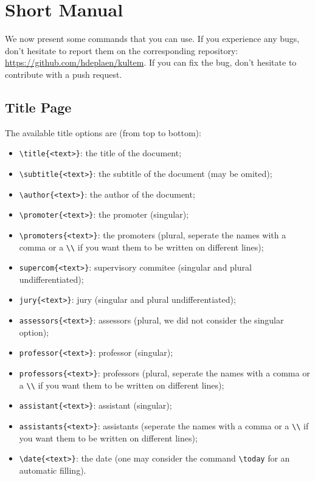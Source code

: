 \documentclass[oneside,a4paper,11pt,explicit]{book}
\begin{document}
\chapter{Short Manual}
\lstset{basicstyle=\ttfamily,breaklines=true}
We now present some commands that you can use. If you experience any bugs, don't hesitate to report them on the corresponding repository: \url{https://github.com/hdeplaen/kultem}. If you can fix the bug, don't hesitate to contribute with a push request.

\section{Title Page}
The available title options are (from top to bottom):
\begin{itemize}
    \item \verb|\title{<text>}|: the title of the document;
    \item \verb|\subtitle{<text>}|: the subtitle of the document (may be omited);
    \item \verb|\author{<text>}|: the author of the document;
    \item \verb|\promoter{<text>}|: the promoter (singular);
    \item \verb|\promoters{<text>}|: the promoters (plural, seperate the names with a comma or a \verb|\\| if you want them to be written on different lines);
    \item \verb|supercom{<text>}|: supervisory commitee  (singular and plural undifferentiated);
    \item \verb|jury{<text>}|: jury (singular and plural undifferentiated);
    \item \verb|assessors{<text>}|: assessors (plural, we did not consider the singular option);
    \item \verb|professor{<text>}|:  professor (singular);
    \item \verb|professors{<text>}|: professors (plural, seperate the names with a comma or a \verb|\\| if you want them to be written on different lines); 
    \item \verb|assistant{<text>}|: assistant (singular);
    \item \verb|assistants{<text>}|: assistants (seperate the names with a comma or a \verb|\\| if you want them to be written on different lines);
    \item \verb|\date{<text>}|: the date (one may consider the command \verb|\today| for an automatic filling).
\end{itemize}
\end{document}
